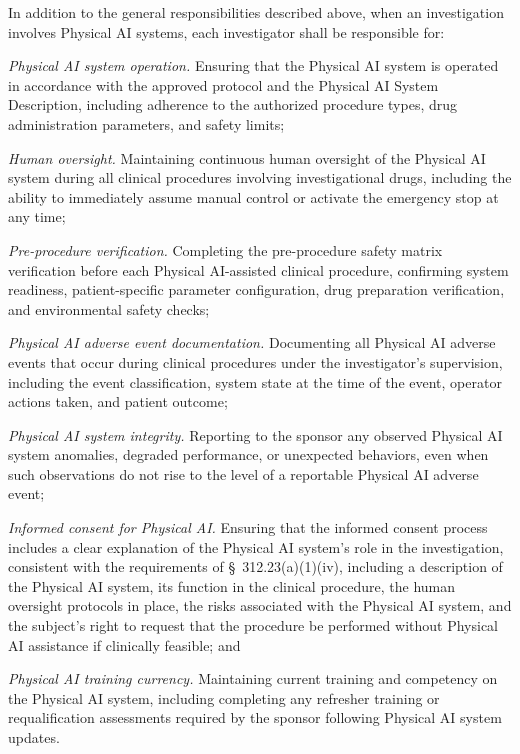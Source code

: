 \documentclass[11pt]{article}
\begin{document}
In addition to the general responsibilities described above, when an investigation involves Physical AI systems, each investigator shall be responsible for:

\begin{description}[leftmargin=0.8cm,style=sameline]
\item[(a)] \textit{Physical AI system operation.} Ensuring that the Physical AI system is operated in accordance with the approved protocol and the Physical AI System Description, including adherence to the authorized procedure types, drug administration parameters, and safety limits;
\item[(b)] \textit{Human oversight.} Maintaining continuous human oversight of the Physical AI system during all clinical procedures involving investigational drugs, including the ability to immediately assume manual control or activate the emergency stop at any time;
\item[(c)] \textit{Pre-procedure verification.} Completing the pre-procedure safety matrix verification before each Physical AI-assisted clinical procedure, confirming system readiness, patient-specific parameter configuration, drug preparation verification, and environmental safety checks;
\item[(d)] \textit{Physical AI adverse event documentation.} Documenting all Physical AI adverse events that occur during clinical procedures under the investigator's supervision, including the event classification, system state at the time of the event, operator actions taken, and patient outcome;
\item[(e)] \textit{Physical AI system integrity.} Reporting to the sponsor any observed Physical AI system anomalies, degraded performance, or unexpected behaviors, even when such observations do not rise to the level of a reportable Physical AI adverse event;
\item[(f)] \textit{Informed consent for Physical AI.} Ensuring that the informed consent process includes a clear explanation of the Physical AI system's role in the investigation, consistent with the requirements of \S~312.23(a)(1)(iv), including a description of the Physical AI system, its function in the clinical procedure, the human oversight protocols in place, the risks associated with the Physical AI system, and the subject's right to request that the procedure be performed without Physical AI assistance if clinically feasible; and
\item[(g)] \textit{Physical AI training currency.} Maintaining current training and competency on the Physical AI system, including completing any refresher training or requalification assessments required by the sponsor following Physical AI system updates.
\end{description}
\end{document}
